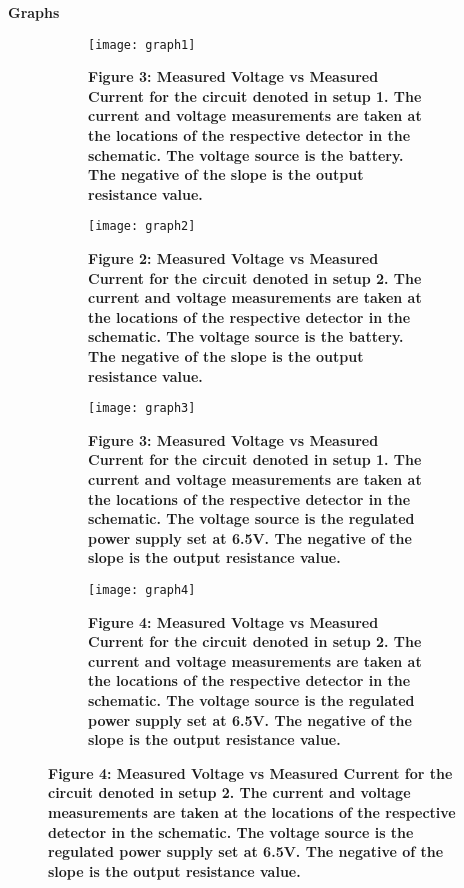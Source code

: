 \newpage
{\large\textbf{Graphs}}
\begin{figure}[H]
    \centering
	\begin{subfigure}{0.45\textwidth}
		\texttt{[image: graph1]}
		\caption{\textbf{Figure 3: Measured Voltage vs Measured Current for the circuit denoted in setup 1. The current and voltage measurements are taken at the locations of the respective detector in the schematic. The voltage source is the battery. The negative of the slope is the output resistance value.}}
	\end{subfigure}
    \hspace{0.08\textwidth}
	\begin{subfigure}{0.45\textwidth}
		\texttt{[image: graph2]}
		\caption{\textbf{Figure 2: Measured Voltage vs Measured Current for the circuit denoted in setup 2. The current and voltage measurements are taken at the locations of the respective detector in the schematic. The voltage source is the battery. The negative of the slope is the output resistance value.}}
	\end{subfigure}
    \begin{subfigure}{0.45\textwidth}
		\texttt{[image: graph3]}
		\caption{\textbf{Figure 3: Measured Voltage vs Measured Current for the circuit denoted in setup 1. The current and voltage measurements are taken at the locations of the respective detector in the schematic. The voltage source is the regulated power supply set at 6.5V. The negative of the slope is the output resistance value.}}
	\end{subfigure}
    \hspace{0.08\textwidth}
	\begin{subfigure}{0.45\textwidth}
		\texttt{[image: graph4]}
		\caption{\textbf{Figure 4: Measured Voltage vs Measured Current for the circuit denoted in setup 2. The current and voltage measurements are taken at the locations of the respective detector in the schematic. The voltage source is the regulated power supply set at 6.5V. The negative of the slope is the output resistance value.}}
	\end{subfigure}

\end{figure}

